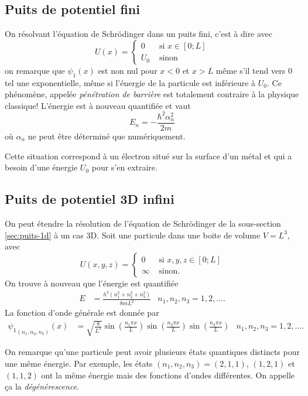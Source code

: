 \subsection{Puits de potentiel fini}
On résolvant l'équation de Schrödinger dans un puits
fini, c'est à dire avec
\[ U(x) = \left\{
  \begin{aligned}
    0 & \text{ si } x \in [0; L]\\
    U_0 & \text{ sinon}
  \end{aligned}
\right. \]
on remarque que $\psi_1(x)$ est non nul pour $x < 0$ et $x > L$
même s'il tend vers 0 tel une exponentielle, même si l'énergie de
la particule est inférieure à $U_0$. Ce phénomène,
appelée \emph{pénétration de barrière} est totalement
contraire à la physique classique!
L'énergie est à nouveau quantifiée et vaut
\[
  E_n = -\frac{\hbar^2\alpha_n^2}{2m}
\]
où $\alpha_n$ ne peut être déterminé que numériquement.

\begin{myrem}
	Cette situation correspond à un électron
	situé sur la surface d'un métal et qui a besoin
	d'une énergie $U_0$ pour s'en extraire.
\end{myrem}

\subsection{Puits de potentiel 3D infini}
On peut étendre la résolution de l'équation de Schrödinger
de la sous-section \ref{sec:puits-1d} à un cas 3D.
Soit une particule dans une boite de volume $V = L^3$,
avec
\[ U(x,y,z) = \left\{
  \begin{aligned}
    0 & \text{ si } x,y,z \in [0; L]\\
    \infty & \text{ sinon}.
  \end{aligned}
\right. \]
On trouve à nouveau que l'énergie est quantifiée
\begin{align*}
  E & = \frac{h^2(n_1^2+n_2^2+n_3^2)}{8mL^2} & n_1,n_2,n_3 = 1, 2, \ldots.
\end{align*}
La fonction d'onde générale est donnée par
\begin{align*}
  {\psi_1}_{(n_1,n_2,n_3)}(x) & =
  \sqrt{\frac{8}{L^3}}\sin\left(\frac{n_1\pi x}{L}\right)
											\sin\left(\frac{n_2\pi x}{L}\right)
											\sin\left(\frac{n_3\pi x}{L}\right)& n_1,n_2,n_3 = 1, 2, \ldots.
\end{align*}

On remarque qu'une particule peut avoir plusieurs états
quantiques distincts pour une même énergie. Par exemple,
les états $(n_1,n_2,n_3) = (2,1,1)$, $(1,2,1)$ et $(1,1,2)$
ont la même énergie mais des fonctions d'ondes différentes.
On appelle ça la \emph{dégénérescence}.
